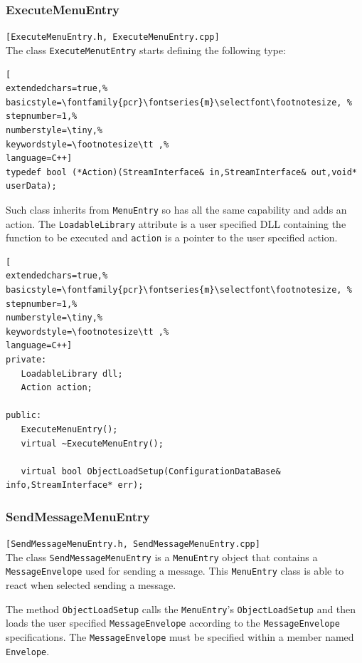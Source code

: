 \subsubsection{ExecuteMenuEntry}
\texttt{[ExecuteMenuEntry.h, ExecuteMenuEntry.cpp]}\\
The class \texttt{ExecuteMenutEntry} starts defining the following type:

\begin{lstlisting}[
extendedchars=true,%
basicstyle=\fontfamily{pcr}\fontseries{m}\selectfont\footnotesize, %
stepnumber=1,%
numberstyle=\tiny,%
keywordstyle=\footnotesize\tt ,%
language=C++]
typedef bool (*Action)(StreamInterface& in,StreamInterface& out,void* userData);
\end{lstlisting}

Such class inherits from \texttt{MenuEntry} so has all the same capability and adds an action.
The \texttt{LoadableLibrary} attribute is a user specified DLL containing the function to be executed and \texttt{action} is a pointer to the user specified action.

\begin{lstlisting}[
extendedchars=true,%
basicstyle=\fontfamily{pcr}\fontseries{m}\selectfont\footnotesize, %
stepnumber=1,%
numberstyle=\tiny,%
keywordstyle=\footnotesize\tt ,%
language=C++]
private:
   LoadableLibrary dll;
   Action action;

public:
   ExecuteMenuEntry();
   virtual ~ExecuteMenuEntry();

   virtual bool ObjectLoadSetup(ConfigurationDataBase& info,StreamInterface* err);
\end{lstlisting}



\subsubsection{SendMessageMenuEntry}
\texttt{[SendMessageMenuEntry.h, SendMessageMenuEntry.cpp]}\\
The class \texttt{SendMessageMenuEntry} is a \texttt{MenuEntry} object that contains a \texttt{MessageEnvelope} used for sending a message. This \texttt{MenuEntry} class is able to react when selected sending a message.

The method \texttt{ObjectLoadSetup} calls the \texttt{MenuEntry}'s \texttt{ObjectLoadSetup} and then loads the user specified \texttt{MessageEnvelope} according to the \texttt{MessageEnvelope} specifications. The \texttt{MessageEnvelope} must be specified within a member named \texttt{Envelope}.
 
